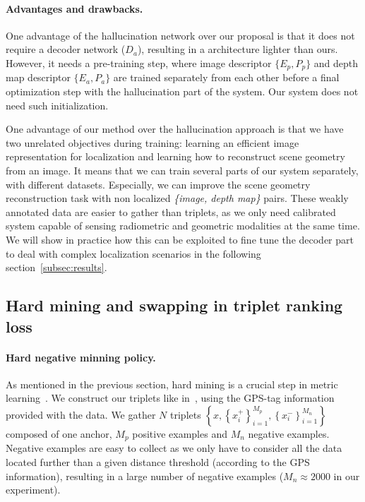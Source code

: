 \paragraph{Advantages and drawbacks.}
\label{paragraph:adv}
One advantage of the hallucination network over our proposal is that it does not require a decoder network ($D_a$), resulting in a architecture lighter than ours. However, it needs a pre-training step, where image descriptor $\{E_p, P_p\}$ and depth map descriptor $\{E_a, P_a\}$ are trained separately from each other before a final optimization step with the hallucination part of the system. Our system does not need such initialization. 

One advantage of our method over the hallucination approach is that we have two unrelated objectives during training: learning an efficient image representation for localization and learning how to reconstruct scene geometry from an image. It means that we can train several parts of our system separately, with different datasets. Especially, we can improve the scene geometry reconstruction task with non localized \textit{\{image, depth map\}} pairs. These weakly annotated data are easier to gather than triplets, as we only need calibrated system capable of sensing radiometric and geometric modalities at the same time. We will show in practice how this can be exploited to fine tune the decoder part to deal with complex localization scenarios in the following section~\ref{subsec:results}.

\subsection{Hard mining and swapping in triplet ranking loss}
\label{subsec:hard_minning}

\paragraph{Hard negative minning policy.} As mentioned in the previous section, hard mining is a crucial step in metric learning~\citep{Arandjelovic2017,Radenovic2017,Gordo2016,Iscen2018}. We construct our triplets like in~\citep{Arandjelovic2017}, using the GPS-tag information provided with the data. We gather $N$ triplets $\left\lbrace x, \left\lbrace x^+_i\right\rbrace_{i=1}^{M_p}, \left\lbrace x^-_i\right\rbrace_{i=1}^{M_n} \right\rbrace$ composed of one anchor, $M_p$ positive examples and $M_n$ negative examples. Negative examples are easy to collect as we only have to consider all the data located further than a given distance threshold (according to the GPS information), resulting in a large number of negative examples ($M_n \approx 2000$ in our experiment). 

